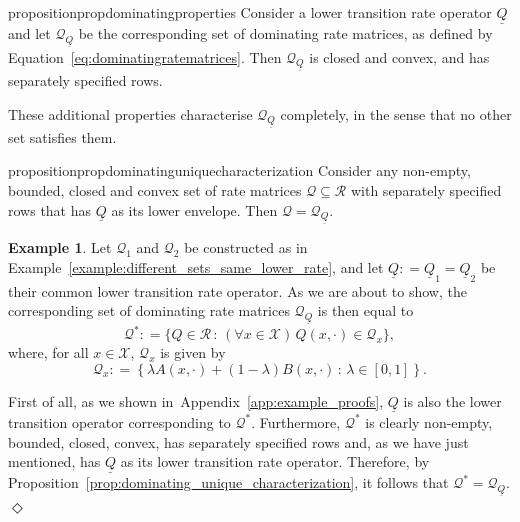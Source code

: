 \documentclass[10pt,a4paper]{paper}
\theoremstyle{definition}
\newtheorem{exmp}{Example}
\newcommand{\states}{\mathcal{X}}
\newcommand{\gambles}{\mathcal{L}}
\newcommand{\gamblesX}{\gambles(\states)}
\newcommand{\rateset}{\mathcal{Q}}
\newcommand{\lrate}{\underline{Q}}
\newcommand{\coloneqq}{:\!=}
\newcommand{\exampleend}{\hfill$\Diamond$}
\newcommand{\exampleproofref}{Appendix~\ref{app:example_proofs}}
\begin{document}
\begin{restatable}{proposition}{propdominatingproperties}
\label{prop:dominatingproperties}
Consider a lower transition rate operator $\lrate$ and let $\rateset_{\lrate}$ be the corresponding set of dominating rate matrices, as defined by Equation~\eqref{eq:dominatingratematrices}. Then $\rateset_{\lrate}$ is closed and convex, and has separately specified rows.
\end{restatable}

\noindent
These additional properties characterise $\rateset_{\lrate}$ completely, in the sense that no other set satisfies them.

\begin{restatable}{proposition}{propdominatinguniquecharacterization}
\label{prop:dominating_unique_characterization}
Consider any non-empty, bounded, closed and convex set of rate matrices $\rateset\subseteq\mathcal{R}$ with separately specified rows that has $\lrate$ as its lower envelope. Then $\rateset=\rateset_{\lrate}$.
\end{restatable}


\begin{exmp}\label{ex:dominatingset}
Let $\rateset_1$ and $\rateset_2$ be constructed as in Example~\ref{example:different_sets_same_lower_rate}, and let $\lrate\coloneqq\lrate_1=\lrate_2$ be their common lower transition rate operator. As we are about to show, the corresponding set of dominating rate matrices $\rateset_{\lrate}$ is then equal to
\begin{equation}\label{eq:ex:dominatingset:globaldef}
\rateset^* \coloneqq \{Q\in\mathcal{R}\,:\,(\forall x\in\states)\, Q(x,\cdot)\in\rateset_x\},
\end{equation}
where, for all $x\in\states$, $\rateset_x$ is given by
\begin{equation}\label{eq:ex:dominatingset:localdef}
\rateset_x \coloneqq \left\{\lambda A(x,\cdot)+(1-\lambda)B(x,\cdot)\,:\,\lambda\in[0,1]\right\}.
\end{equation}

First of all, as we shown in~\exampleproofref, $\lrate$ is also the lower transition operator corresponding to $\rateset^*$. Furthermore, $\rateset^*$ is clearly non-empty, bounded, closed, convex, has separately specified rows and, as we have just mentioned, has $\lrate$ as its lower transition rate operator. Therefore, by Proposition~\ref{prop:dominating_unique_characterization}, it follows that $\rateset^*=\rateset_{\lrate}$.
\exampleend
\end{exmp}
\end{document}
